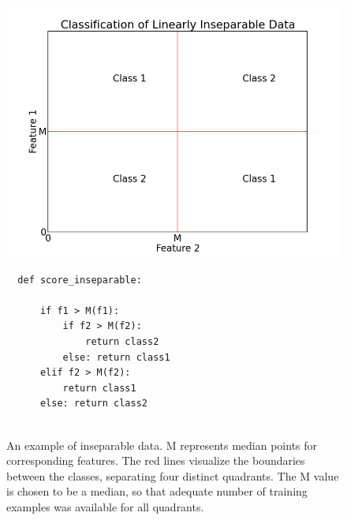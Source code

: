 \documentclass[12pt,notitlepage,twoside]{scrreprt}
\begin{document}
\begin{figure}[h!]
\begin{minipage}[b]{0.55\linewidth}
  \includegraphics[width=1.2\linewidth]{figs/gen_insep.png}
\end{minipage}
\hspace{0.5cm}
\begin{minipage}[b]{0.4\linewidth}
\begin{verbatim}
  def score_inseparable:

      if f1 > M(f1):
          if f2 > M(f2):
              return class2
          else: return class1
      elif f2 > M(f2): 
          return class1
      else: return class2


\end{verbatim}
\end{minipage}
\caption{An example of inseparable data. M represents median points for corresponding
features.  The red lines visualize the boundaries between the classes, separating four
distinct quadrants. The M value is chosen to be a median, so that adequate number of
training examples was available for all quadrants.  \label{code:insep}}
\end{figure}
\end{document}
